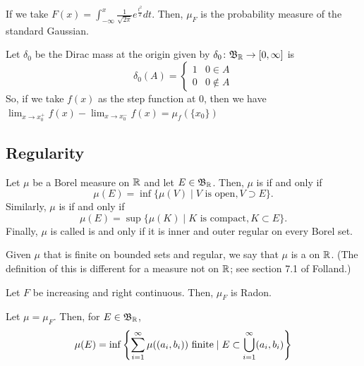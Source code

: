 \documentclass[11pt,leqno,oneside]{amsbook}
\numberwithin{thm}{section}
\begin{document}
\begin{example}
  If we take $F(x) = \int_{-\infty}^x \frac{1}{\sqrt{2\pi}}
  e^{\frac{t^2}{2}} dt$. Then, $\mu_F$ is the probability measure of
  the standard Gaussian.
\end{example}
\begin{example}
  Let $\delta_0$ be the Dirac mass at the origin given by $\delta_0
  \colon \mathfrak{B}_{\mathbb R} \to [0,\infty]$ is \[
    \delta_0(A) =
    \begin{cases}
      1 & 0 \in A \\
      0 & 0 \not \in A
    \end{cases}
  \]
  So, if we take $f(x)$ as the step function at $0$,
  then we have $\lim_{x \to x_0^+} f(x) - \lim_{x \to x_0^-} f(x) = \mu_f(\{x_0\})$
\end{example}
\subsection{Regularity}
\begin{defn}
  Let $\mu$ be a Borel measure on ${\mathbb R}$ and let $E \in \mathfrak{B}_{\mathbb R}$. Then,
  $\mu$ is  if and only if \[
    \mu(E) = \inf \{\mu(V) \mid V \text{ is open}, V \supset E\}.
  \]
  Similarly, $\mu$ is  if and only if \[
    \mu(E) = \sup \{\mu(K) \mid K \text{ is compact}, K \subset E\}.
  \]
  Finally, $\mu$ is called  is and only if it is inner and
  outer regular on every Borel set.
\end{defn}
\begin{defn}
  Given $\mu$ that is finite on bounded sets and regular, we say that
  $\mu$ is a  on ${\mathbb R}$. (The definition of this is
  different for a measure not on ${\mathbb R}$; see section 7.1 of Folland.)
\end{defn}
\begin{thm}\label{radon-thm}
  Let $F$ be increasing and right continuous. Then, $\mu_F$ is Radon.
\end{thm}
\begin{lem}
  Let $\mu = \mu_F$. Then, for $E \in \mathfrak{B}_{\mathbb R}$, \[
    \mu(E) = \inf \left\{ \sum_{i=1}^\infty \mu((a_i,b_i)) \text{
        finite} \mid E
      \subset \bigcup_{i=1}^\infty (a_i,b_i) \right\}
  \]
\end{lem}
\end{document}
